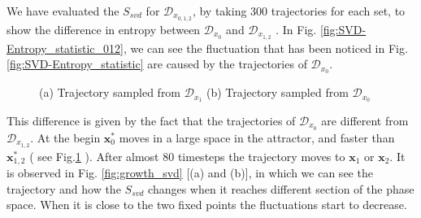 \documentclass{article}
\begin{document}
We have evaluated the $S_{svd}$ for $\mathcal{D}_{x_{0,1,2}}$, by taking 300 trajectories for each set, to show the difference in entropy between $\mathcal{D}_{x_0}$ and $\mathcal{D}_{x_{1,2}}$ . In Fig. \ref{fig:SVD-Entropy_statistic_012}, we can see the fluctuation that has been noticed in Fig. \ref{fig:SVD-Entropy_statistic} are caused by the trajectories of $\mathcal{D}_{{x}_0}$. 
\begin{figure}
    \centering 
    \caption{(a) Trajectory sampled from $\mathcal{D}_{x_1}$ (b) Trajectory sampled from $\mathcal{D}_{x_0}$  }
    \label{fig:different_trajectories}
\end{figure}
This difference is given by the fact that the trajectories of $\mathcal{D}_{x_0}$ are different from $\mathcal{D}_{x_{1,2}}$. At the begin $\boldsymbol{x}^{*}_0$ moves in a large space in the attractor, and faster than $\boldsymbol{x}^{*}_{1,2}$ ( see Fig.\ref{fig:different_trajectories} ). After almost 80 timesteps the trajectory moves to $\boldsymbol{x}_{1}$ or $\boldsymbol{x}_{2}$. It is observed in Fig. \ref{fig:growth_svd} [(a) and (b)], in which we can see the trajectory and how the $S_{svd}$ changes when it reaches different section of the phase space. 
When it is close to the two fixed points the fluctuations start to decrease. 
\end{document}
